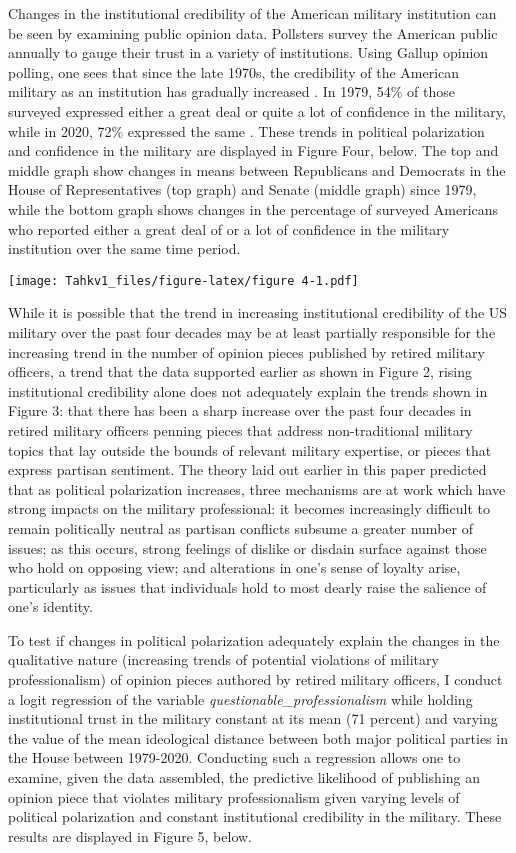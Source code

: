 \documentclass[12pt,]{article}
\begin{document}
Changes in the institutional credibility of the American military institution can be seen by examining public opinion data. Pollsters survey the American public annually to gauge their trust in a variety of institutions. Using Gallup opinion polling, one sees that since the late 1970s, the credibility of the American military as an institution has gradually increased \autocite{gallup_polls_confidence_2020}. In 1979, 54\% of those surveyed expressed either a great deal or quite a lot of confidence in the military, while in 2020, 72\% expressed the same \autocite{gallup_polls_confidence_2020}. These trends in political polarization and confidence in the military are displayed in Figure Four, below. The top and middle graph show changes in means between Republicans and Democrats in the House of Representatives (top graph) and Senate (middle graph) since 1979, while the bottom graph shows changes in the percentage of surveyed Americans who reported either a great deal of or a lot of confidence in the military institution over the same time period.

\texttt{[image: Tahkv1\_files/figure-latex/figure 4-1.pdf]}

While it is possible that the trend in increasing institutional credibility of the US military over the past four decades may be at least partially responsible for the increasing trend in the number of opinion pieces published by retired military officers, a trend that the data supported earlier as shown in Figure 2, rising institutional credibility alone does not adequately explain the trends shown in Figure 3: that there has been a sharp increase over the past four decades in retired military officers penning pieces that address non-traditional military topics that lay outside the bounds of relevant military expertise, or pieces that express partisan sentiment. The theory laid out earlier in this paper predicted that as political polarization increases, three mechanisms are at work which have strong impacts on the military professional: it becomes increasingly difficult to remain politically neutral as partisan conflicts subsume a greater number of issues; as this occurs, strong feelings of dislike or disdain surface against those who hold on opposing view; and alterations in one's sense of loyalty arise, particularly as issues that individuals hold to most dearly raise the salience of one's identity.

To test if changes in political polarization adequately explain the changes in the qualitative nature (increasing trends of potential violations of military professionalism) of opinion pieces authored by retired military officers, I conduct a logit regression of the variable \emph{questionable\_professionalism} while holding institutional trust in the military constant at its mean (71 percent) and varying the value of the mean ideological distance between both major political parties in the House between 1979-2020. Conducting such a regression allows one to examine, given the data assembled, the predictive likelihood of publishing an opinion piece that violates military professionalism given varying levels of political polarization and constant institutional credibility in the military. These results are displayed in Figure 5, below.
\end{document}
